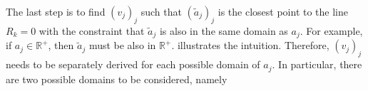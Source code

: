 


The last step is to find $(v_j)_j$ such that $(\tilde{a}_j)_j$ is the closest point to the line $R_k=0$ with the constraint that $\tilde{a}_j$ is also in the same domain as $a_j$. For example, if $a_j \in \mathbb{R}^+$, then $\tilde{a}_j$ must be also in $\mathbb{R}^+$. \addfigure{\ref{fig:dtd_rule_cases}} illustrates the intuition.  Therefore, $(v_j)_j$ needs to be separately derived for each possible domain of $a_j$. In particular, there are two possible domains to be considered, namely 
%

\begin{figure}
\centering

     \hfill
{}

\label{fig:dtd_rule_cases}
\end{figure}


%
%

